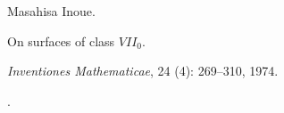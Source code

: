Masahisa Inoue.

\newblock On surfaces of class {$VII_0$}.

\newblock \emph{Inventiones Mathematicae}, 24 (4): 269--310,
  1974.

\newblock {}.



